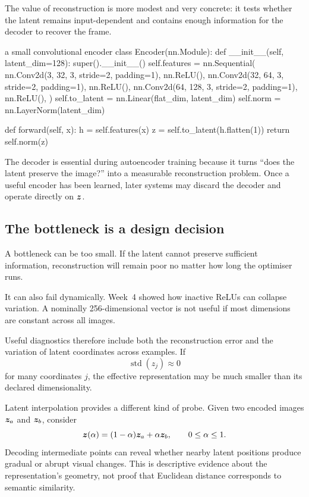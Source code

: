 The value of reconstruction is more modest and very concrete: it tests whether the latent remains input-dependent and contains enough information for the decoder to recover the frame.

\begin{pytorchbox}{a small convolutional encoder}
class Encoder(nn.Module):
    def __init__(self, latent_dim=128):
        super().__init__()
        self.features = nn.Sequential(
            nn.Conv2d(3, 32, 3, stride=2, padding=1), nn.ReLU(),
            nn.Conv2d(32, 64, 3, stride=2, padding=1), nn.ReLU(),
            nn.Conv2d(64, 128, 3, stride=2, padding=1), nn.ReLU(),
        )
        self.to_latent = nn.Linear(flat_dim, latent_dim)
        self.norm = nn.LayerNorm(latent_dim)

    def forward(self, x):
        h = self.features(x)
        z = self.to_latent(h.flatten(1))
        return self.norm(z)
\end{pytorchbox}

The decoder is essential during autoencoder training because it turns ``does the latent preserve the image?'' into a measurable reconstruction problem. Once a useful encoder has been learned, later systems may discard the decoder and operate directly on \(\bm{z}\).

\subsection{The bottleneck is a design decision}

A bottleneck can be too small. If the latent cannot preserve sufficient information, reconstruction will remain poor no matter how long the optimiser runs.

It can also fail dynamically. Week~4 showed how inactive ReLUs can collapse variation. A nominally 256-dimensional vector is not useful if most dimensions are constant across all images.

Useful diagnostics therefore include both the reconstruction error and the variation of latent coordinates across examples. If
\[
  \operatorname{std}(z_j) \approx 0
\]
for many coordinates \(j\), the effective representation may be much smaller than its declared dimensionality.

Latent interpolation provides a different kind of probe. Given two encoded images \(\bm{z}_a\) and \(\bm{z}_b\), consider
\[
  \bm{z}(\alpha) = (1-\alpha)\bm{z}_a + \alpha\bm{z}_b,
  \qquad 0\le\alpha\le1.
\]
Decoding intermediate points can reveal whether nearby latent positions produce gradual or abrupt visual changes. This is descriptive evidence about the representation's geometry, not proof that Euclidean distance corresponds to semantic similarity.

